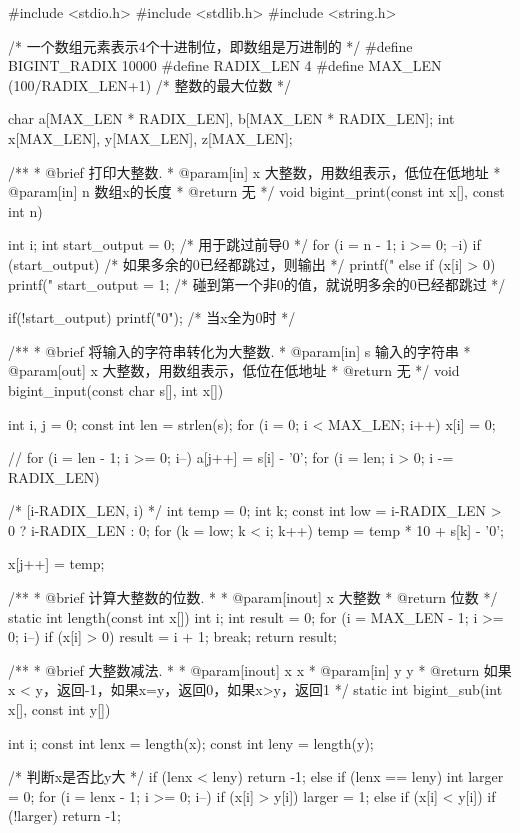 \begin{Codex}[label=bigint_div.c]
#include <stdio.h>
#include <stdlib.h>
#include <string.h>

/* 一个数组元素表示4个十进制位，即数组是万进制的 */
#define BIGINT_RADIX 10000
#define RADIX_LEN 4
#define MAX_LEN (100/RADIX_LEN+1)  /* 整数的最大位数 */

char    a[MAX_LEN * RADIX_LEN], b[MAX_LEN * RADIX_LEN];
int     x[MAX_LEN], y[MAX_LEN], z[MAX_LEN];

/**
 * @brief 打印大整数.
 * @param[in] x 大整数，用数组表示，低位在低地址
 * @param[in] n 数组x的长度
 * @return 无
 */
void bigint_print(const int x[], const int n) {
    int i;
    int start_output = 0;  /* 用于跳过前导0 */
    for (i = n - 1; i >= 0; --i) {
        if (start_output) {  /* 如果多余的0已经都跳过，则输出 */
            printf("%
        } else if (x[i] > 0) {
            printf("%
            start_output = 1; /* 碰到第一个非0的值，就说明多余的0已经都跳过 */
        }
    }

    if(!start_output) printf("0");  /* 当x全为0时 */
}

/**
 * @brief 将输入的字符串转化为大整数.
 * @param[in] s 输入的字符串
 * @param[out] x 大整数，用数组表示，低位在低地址
 * @return 无
 */
void bigint_input(const char s[], int x[]) {
    int i, j = 0;
    const int len = strlen(s);
    for (i = 0; i < MAX_LEN; i++) x[i] = 0;

    // for (i = len - 1; i >= 0; i--) a[j++] = s[i] - '0';
    for (i = len; i > 0; i -= RADIX_LEN) {  /* [i-RADIX_LEN, i) */
        int temp = 0;
        int k;
        const int low = i-RADIX_LEN > 0 ? i-RADIX_LEN : 0;
        for (k = low; k < i; k++) {
            temp = temp * 10 + s[k] - '0';
        }

        x[j++] = temp;
    }
}

/**
 * @brief 计算大整数的位数.
 *
 * @param[inout] x 大整数
 * @return 位数
 */
static int length(const int x[]) {
    int i;
    int result = 0;
    for (i = MAX_LEN - 1; i >= 0; i--) if (x[i] > 0) {
        result = i + 1;
        break;
    }
    return result;
}

/**
 * @brief 大整数减法.
 *
 * @param[inout] x x
 * @param[in] y y
 * @return 如果x < y，返回-1，如果x=y，返回0，如果x>y，返回1
 */
static int bigint_sub(int x[], const int y[]) {
    int i;
    const int lenx = length(x);
    const int leny = length(y);

    /* 判断x是否比y大 */
    if (lenx < leny) return -1;
    else if (lenx == leny) {
        int larger = 0;
        for (i = lenx - 1; i >= 0; i--) {
            if (x[i] > y[i]) {
                larger = 1;
            } else if (x[i] < y[i]) {
                if (!larger) return -1;
            }
        }
    }
    
}
\end{Codex}
